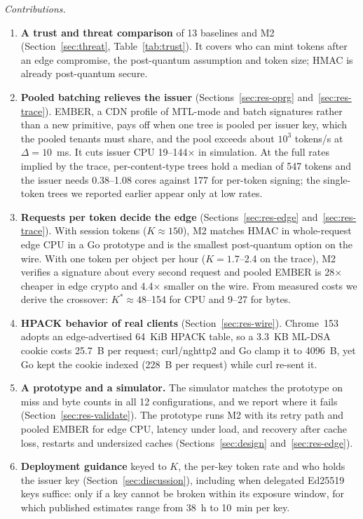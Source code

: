 \emph{Contributions.}
\begin{enumerate}
\item \textbf{A trust and threat comparison} of 13 baselines and M2 (Section~\ref{sec:threat}, Table~\ref{tab:trust}). It covers who can mint tokens after an edge compromise, the post-quantum assumption and token size; HMAC is already post-quantum secure.
\item \textbf{Pooled batching relieves the issuer} (Sections~\ref{sec:res-oprg} and~\ref{sec:res-trace}). EMBER, a CDN profile of MTL-mode and batch signatures rather than a new primitive, pays off when one tree is pooled per issuer key, which the pooled tenants must share, and the pool exceeds about $10^3$ tokens/s at $\Delta=10$~ms. It cuts issuer CPU 19--144$\times$ in simulation. At the full rates implied by the trace, per-content-type trees hold a median of 547 tokens and the issuer needs 0.38--1.08 cores against 177 for per-token signing; the single-token trees we reported earlier appear only at low rates.
\item \textbf{Requests per token decide the edge} (Sections~\ref{sec:res-edge} and~\ref{sec:res-trace}). With session tokens ($K\approx150$), M2 matches HMAC in whole-request edge CPU in a Go prototype and is the smallest post-quantum option on the wire. With one token per object per hour ($K=1.7$--2.4 on the trace), M2 verifies a signature about every second request and pooled EMBER is 28$\times$ cheaper in edge crypto and 4.4$\times$ smaller on the wire. From measured costs we derive the crossover: $K^*\approx48$--154 for CPU and 9--27 for bytes.
\item \textbf{HPACK behavior of real clients} (Section~\ref{sec:res-wire}). Chrome~153 adopts an edge-advertised 64~KiB HPACK table, so a 3.3~KB ML-DSA cookie costs 25.7~B per request; curl/nghttp2 and Go clamp it to 4096~B, yet Go kept the cookie indexed (228~B per request) while curl re-sent it.
\item \textbf{A prototype and a simulator.} The simulator matches the prototype on miss and byte counts in all 12 configurations, and we report where it fails (Section~\ref{sec:res-validate}). The prototype runs M2 with its retry path and pooled EMBER for edge CPU, latency under load, and recovery after cache loss, restarts and undersized caches (Sections~\ref{sec:design} and~\ref{sec:res-edge}).
\item \textbf{Deployment guidance} keyed to $K$, the per-key token rate and who holds the issuer key (Section~\ref{sec:discussion}), including when delegated Ed25519 keys suffice: only if a key cannot be broken within its exposure window, for which published estimates range from 38~h to 10~min per key.
\end{enumerate}

